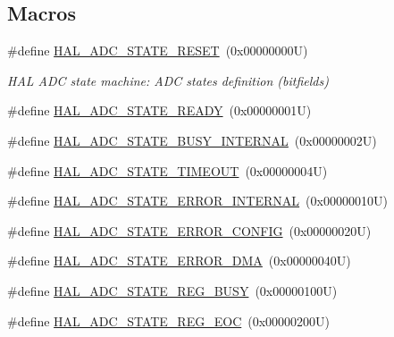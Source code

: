 \subsection*{Macros}
\begin{DoxyCompactItemize}
\item 
\#define \hyperlink{group___a_d_c___exported___types_ga3f995b6dedd7366d0663f852511b9104}{H\+A\+L\+\_\+\+A\+D\+C\+\_\+\+S\+T\+A\+T\+E\+\_\+\+R\+E\+S\+ET}~(0x00000000\+U)
\begin{DoxyCompactList}\small\item\em H\+AL A\+DC state machine\+: A\+DC states definition (bitfields) \end{DoxyCompactList}\item 
\#define \hyperlink{group___a_d_c___exported___types_gadccf2475d321f82bc5b18b4c0031794b}{H\+A\+L\+\_\+\+A\+D\+C\+\_\+\+S\+T\+A\+T\+E\+\_\+\+R\+E\+A\+DY}~(0x00000001\+U)
\item 
\#define \hyperlink{group___a_d_c___exported___types_ga7055248355e179ee208d23bd2ce8ba69}{H\+A\+L\+\_\+\+A\+D\+C\+\_\+\+S\+T\+A\+T\+E\+\_\+\+B\+U\+S\+Y\+\_\+\+I\+N\+T\+E\+R\+N\+AL}~(0x00000002\+U)
\item 
\#define \hyperlink{group___a_d_c___exported___types_gaaa31ad8c2f5337eac601534cb581dd15}{H\+A\+L\+\_\+\+A\+D\+C\+\_\+\+S\+T\+A\+T\+E\+\_\+\+T\+I\+M\+E\+O\+UT}~(0x00000004\+U)
\item 
\#define \hyperlink{group___a_d_c___exported___types_ga65b592627f1f9277f4b89bfc33a9e641}{H\+A\+L\+\_\+\+A\+D\+C\+\_\+\+S\+T\+A\+T\+E\+\_\+\+E\+R\+R\+O\+R\+\_\+\+I\+N\+T\+E\+R\+N\+AL}~(0x00000010\+U)
\item 
\#define \hyperlink{group___a_d_c___exported___types_ga22d43a637ce63e13e33f5a0f1d4564fd}{H\+A\+L\+\_\+\+A\+D\+C\+\_\+\+S\+T\+A\+T\+E\+\_\+\+E\+R\+R\+O\+R\+\_\+\+C\+O\+N\+F\+IG}~(0x00000020\+U)
\item 
\#define \hyperlink{group___a_d_c___exported___types_ga5a1b4881d17e72aa0823797958221172}{H\+A\+L\+\_\+\+A\+D\+C\+\_\+\+S\+T\+A\+T\+E\+\_\+\+E\+R\+R\+O\+R\+\_\+\+D\+MA}~(0x00000040\+U)
\item 
\#define \hyperlink{group___a_d_c___exported___types_ga516d4b4ebc261c241c69d96aae19acc3}{H\+A\+L\+\_\+\+A\+D\+C\+\_\+\+S\+T\+A\+T\+E\+\_\+\+R\+E\+G\+\_\+\+B\+U\+SY}~(0x00000100\+U)
\item 
\#define \hyperlink{group___a_d_c___exported___types_gae2da191bffb720a553a1e39c10929711}{H\+A\+L\+\_\+\+A\+D\+C\+\_\+\+S\+T\+A\+T\+E\+\_\+\+R\+E\+G\+\_\+\+E\+OC}~(0x00000200\+U)
\item 

\end{DoxyCompactItemize}
